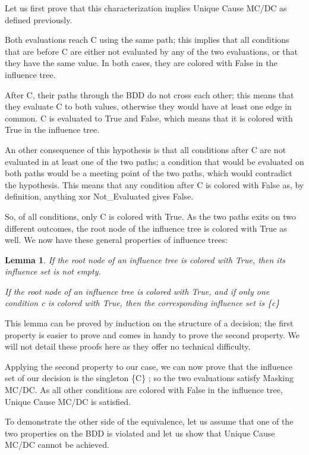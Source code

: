 \documentclass[a4paper,12pt,twoside]{article}
\newtheorem{lemma}{Lemma}[subsection]
\begin{document}
Let us first prove that this characterization implies Unique Cause MC/DC
as defined previously.

Both evaluations reach C using the same path; this implies that all
conditions that are before C are either not evaluated by any of the
two evaluations, or that they have the same value.  In both cases,
they are colored with False in the influence tree.

After C, their paths through the BDD do not cross each other; this means
that they evaluate C to both values, otherwise they would have at least one
edge in common. C is evaluated to True and False, which means that it is
colored with True in the influence tree.

An other consequence of this hypothesis is that all conditions after C
are not evaluated in at least one of the two paths; a condition that
would be evaluated on both paths would be a meeting point of the two
paths, which would contradict the hypothesis. This means that any
condition after C is colored with False as, by definition, anything
xor Not\_Evaluated gives False.

So, of all conditions, only C is colored with True. As the two
paths exits on two different outcomes, the root node of the influence
tree is colored with True as well. We now have these general properties
of influence trees:

\begin{lemma}
  \label{lemma:influence-tree-props}
  If the root node of an influence tree is colored with True, then
  its influence set is not empty.

  If the root node of an influence tree is colored with True, and
  if only one condition c is colored with True, then the corresponding
  influence set is \{c\}
\end{lemma}

This lemma can be proved by induction on the structure of a decision;
the first property is easier to prove and comes in handy to prove the
second property. We will not detail these proofs here as they offer no
technical difficulty.

Applying the second property to our case, we can now prove that the
influence set of our decision is the singleton \{C\} ; so the two
evaluations satisfy Masking MC/DC. As all other conditions are colored
with False in the influence tree, Unique Cause MC/DC is satisfied.

To demonstrate the other side of the equivalence, let us assume that
one of the two properties on the BDD is violated and let us show that
Unique Cause MC/DC cannot be achieved.
\end{document}

